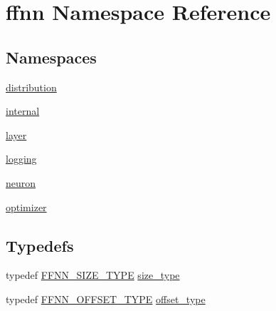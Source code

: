 \hypertarget{namespaceffnn}{\section{ffnn Namespace Reference}
\label{namespaceffnn}
}
\subsection*{Namespaces}
\begin{DoxyCompactItemize}
\item 
\hyperlink{namespaceffnn_1_1distribution}{distribution}
\item 
\hyperlink{namespaceffnn_1_1internal}{internal}
\item 
\hyperlink{namespaceffnn_1_1layer}{layer}
\item 
\hyperlink{namespaceffnn_1_1logging}{logging}
\item 
\hyperlink{namespaceffnn_1_1neuron}{neuron}
\item 
\hyperlink{namespaceffnn_1_1optimizer}{optimizer}
\end{DoxyCompactItemize}
\subsection*{Typedefs}
\begin{DoxyCompactItemize}
\item 
typedef \hyperlink{config_8h_aab5a5a098c5bf31f4176f4a141d2ef65}{F\-F\-N\-N\-\_\-\-S\-I\-Z\-E\-\_\-\-T\-Y\-P\-E} \hyperlink{namespaceffnn_a63b90a2fd70eb76684eac482a51633e5}{size\-\_\-type}
\item 
typedef \hyperlink{config_8h_af04b6e835b960cffc7ed05dfd1685ba0}{F\-F\-N\-N\-\_\-\-O\-F\-F\-S\-E\-T\-\_\-\-T\-Y\-P\-E} \hyperlink{namespaceffnn_add5752d74b38c6e9b200f3d696fc3ec8}{offset\-\_\-type}
\end{DoxyCompactItemize}
